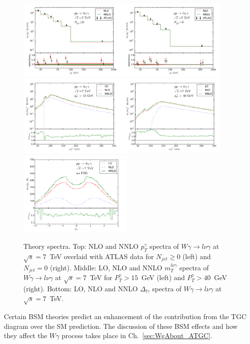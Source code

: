 \begin{figure}[htb]
  \begin{center}
    {\includegraphics[width=0.95\textwidth]{../figs/WgAbout/Theory_NNLO_PtGamma.png}}    
    {\includegraphics[width=0.95\textwidth]{../figs/WgAbout/Theory_NNLO_mT_finer.png}}
    {\includegraphics[width=0.50\textwidth]{../figs/WgAbout/Theory_NNLO_rapidity.png}}
    \caption{Theory spectra. Top: NLO and NNLO $p_T^\gamma$ spectra of $W\gamma\rightarrow l\nu\gamma$ at $\sqrt{s}=7$~TeV overlaid with ATLAS data for $N_{jet} \geq 0$ (left) and $N_{jet}=0$ (right). Middle: LO, NLO and NNLO $m_T^{l\nu\gamma}$ spectra of $W\gamma\rightarrow l\nu\gamma$ at $\sqrt{s}=7$~TeV for $P_T^\gamma>15$~GeV (left) and $P_T^\gamma>40$~GeV (right). Bottom: LO, NLO and NNLO $\Delta_{l\gamma}$ spectra of $W\gamma\rightarrow l\nu\gamma$ at $\sqrt{s}=7$~TeV.}
    \label{fig:Theory_NNLO_and_other}
  \end{center}
\end{figure}

Certain BSM theories predict an enhancement of the contribution from the TGC diagram over the SM prediction. The discussion of these BSM effects and how they affect the $W\gamma$ process takes place in Ch.~\ref{sec:WgAbout_ATGC}. 

